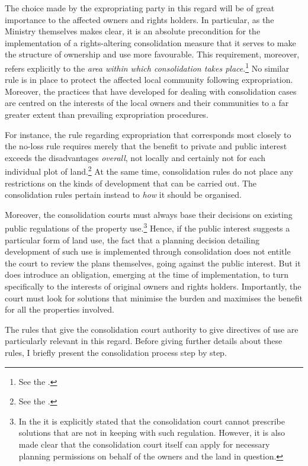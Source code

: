 The choice made by the expropriating party in this regard will be of great importance to the affected owners and rights holders. In particular, as the Ministry themselves makes clear, it is an absolute precondition for the implementation of a rights-altering consolidation measure that it serves to make the structure of ownership and use more favourable. This requirement, moreover, refers explicitly to the \emph{area within which consolidation takes place}.\footnote{See the \cite[3-3]{lca13}.} No similar rule is in place to protect the affected local community following expropriation. Moreover, the practices that have developed for dealing with consolidation cases are centred on the interests of the local owners and their communities to a far greater extent than prevailing expropriation procedures.

For instance, the rule regarding expropriation that corresponds most closely to the no-loss rule requires merely that the benefit to private and public interest exceeds the disadvantages \emph{overall}, not locally and certainly not for each individual plot of land.\footnote{See the \cite[2]{ea59}.} At the same time, consolidation rules do not place any restrictions on the kinds of development that can be carried out. The consolidation rules pertain instead to \emph{how} it should be organised. 

Moreover, the consolidation courts must always base their decisions on existing public regulations of the property use.\footnote{In the \cite[3-17]{lca13} it is explicitly stated that the consolidation court cannot prescribe solutions that are not in keeping with such regulation. However, it is also made clear that the consolidation court itself can apply for necessary planning permissions on behalf of the owners and the land in question.}
Hence, if the public interest suggests a particular form of land use, the fact that a planning decision detailing development of such use is implemented through consolidation does not entitle the court to review the plans themselves, going against the public interest. But it does introduce an obligation, emerging at the time of implementation, to turn specifically to the interests of original owners and rights holders. Importantly, the court must look for solutions that minimise the burden and maximises the benefit for all the properties involved.

The rules that give the consolidation court authority to give directives of use are particularly relevant in this regard. Before giving further details about these rules, I briefly present the consolidation process step by step.

